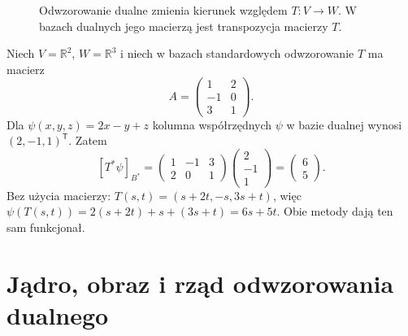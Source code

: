 \begin{figure}[!htbp]
\centering
{}
\caption{Odwzorowanie dualne zmienia kierunek
względem \(T\colon V\to W\).
W bazach dualnych jego macierzą jest
transpozycja macierzy \(T\).}
\label{fig:lin7-dualne-diagram}
\end{figure}

\begin{przyklad}
\label{prz:lin7-transpozycja}
Niech \(V=\mathbb R^2\), \(W=\mathbb R^3\)
i niech w bazach standardowych
odwzorowanie \(T\) ma macierz
\[
 A=\begin{pmatrix}
 1&2\\
 -1&0\\
 3&1
 \end{pmatrix}.
\]
Dla \(\psi(x,y,z)=2x-y+z\)
kolumna współrzędnych \(\psi\)
w bazie dualnej wynosi
\((2,-1,1)^{\mathsf T}\).
Zatem
\[
 [T^*\psi]_{B^*}
 =\begin{pmatrix}1&-1&3\\2&0&1\end{pmatrix}
  \begin{pmatrix}2\\-1\\1\end{pmatrix}
 =\begin{pmatrix}6\\5\end{pmatrix}.
\]
Bez użycia macierzy:
\(T(s,t)=(s+2t,-s,3s+t)\),
więc
\(\psi(T(s,t))=2(s+2t)+s+(3s+t)=6s+5t\).
Obie metody dają ten sam funkcjonał.
\end{przyklad}

\section{Jądro, obraz i rząd odwzorowania dualnego}
\label{sec:lin7-dual-rzad}

